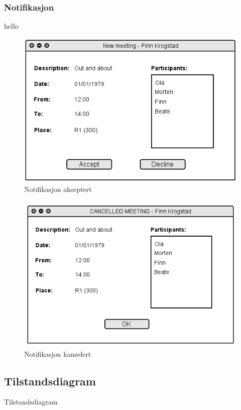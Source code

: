 \subsubsection{Notifikasjon}
hello

\begin{figure}[H]
\centering
\includegraphics[scale=0.65]{images/notifikasjon_akseptert.png}
\caption{Notifikasjon akseptert}
\label{notifikasjon_akseptert_image}
\end{figure}

\begin{figure}[H]
\centering
\includegraphics[scale=0.65]{images/notifikasjon_kanselert.png}
\caption{Notifikasjon kanselert}
\label{notifikasjon_kanselert_image}
\end{figure}


\subsection{Tilstandsdiagram}
Tilstandsdiagram

